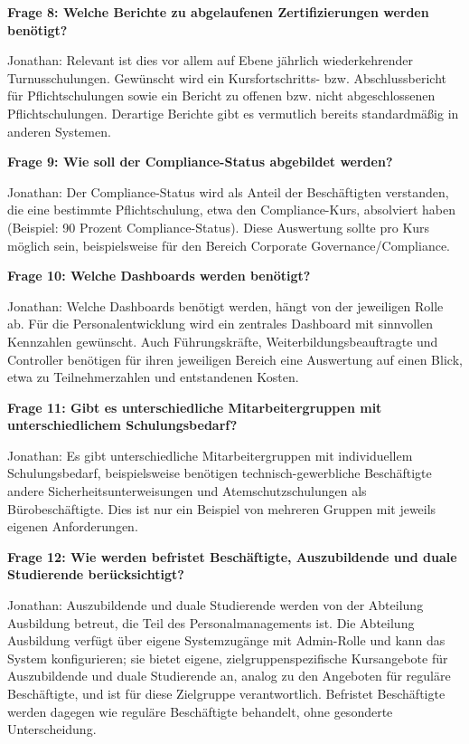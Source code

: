 \documentclass[
    12pt, 
    a4paper,
    ]{scrartcl} %
\begin{document}
\medskip
\textbf{Frage 8: Welche Berichte zu abgelaufenen Zertifizierungen werden ben\"otigt?}

Jonathan: Relevant ist dies vor allem auf Ebene j\"ahrlich wiederkehrender Turnusschulungen. Gew\"unscht wird ein Kursfortschritts- bzw. Abschlussbericht f\"ur Pflichtschulungen sowie ein Bericht zu offenen bzw. nicht abgeschlossenen Pflichtschulungen. Derartige Berichte gibt es vermutlich bereits standardm\"a{\ss}ig in anderen Systemen.

\medskip
\textbf{Frage 9: Wie soll der Compliance-Status abgebildet werden?}

Jonathan: Der Compliance-Status wird als Anteil der Besch\"aftigten verstanden, die eine bestimmte Pflichtschulung, etwa den Compliance-Kurs, absolviert haben (Beispiel: 90 Prozent Compliance-Status). Diese Auswertung sollte pro Kurs m\"oglich sein, beispielsweise f\"ur den Bereich Corporate Governance/Compliance.

\medskip
\textbf{Frage 10: Welche Dashboards werden ben\"otigt?}

Jonathan: Welche Dashboards ben\"otigt werden, h\"angt von der jeweiligen Rolle ab. F\"ur die Personalentwicklung wird ein zentrales Dashboard mit sinnvollen Kennzahlen gew\"unscht. Auch F\"uhrungskr\"afte, Weiterbildungsbeauftragte und Controller ben\"otigen f\"ur ihren jeweiligen Bereich eine Auswertung auf einen Blick, etwa zu Teilnehmerzahlen und entstandenen Kosten.

\bigskip
{}

\textbf{Frage 11: Gibt es unterschiedliche Mitarbeitergruppen mit unterschiedlichem Schulungsbedarf?}

Jonathan: Es gibt unterschiedliche Mitarbeitergruppen mit individuellem Schulungsbedarf, beispielsweise ben\"otigen technisch-gewerbliche Besch\"aftigte andere Sicherheitsunterweisungen und Atemschutzschulungen als B\"urobesch\"aftigte. Dies ist nur ein Beispiel von mehreren Gruppen mit jeweils eigenen Anforderungen.

\medskip
\textbf{Frage 12: Wie werden befristet Besch\"aftigte, Auszubildende und duale Studierende ber\"ucksichtigt?}

Jonathan: Auszubildende und duale Studierende werden von der Abteilung Ausbildung betreut, die Teil des Personalmanagements ist. Die Abteilung Ausbildung verf\"ugt \"uber eigene Systemzug\"ange mit Admin-Rolle und kann das System konfigurieren; sie bietet eigene, zielgruppenspezifische Kursangebote f\"ur Auszubildende und duale Studierende an, analog zu den Angeboten f\"ur regul\"are Besch\"aftigte, und ist f\"ur diese Zielgruppe verantwortlich. Befristet Besch\"aftigte werden dagegen wie regul\"are Besch\"aftigte behandelt, ohne gesonderte Unterscheidung.
\end{document}
